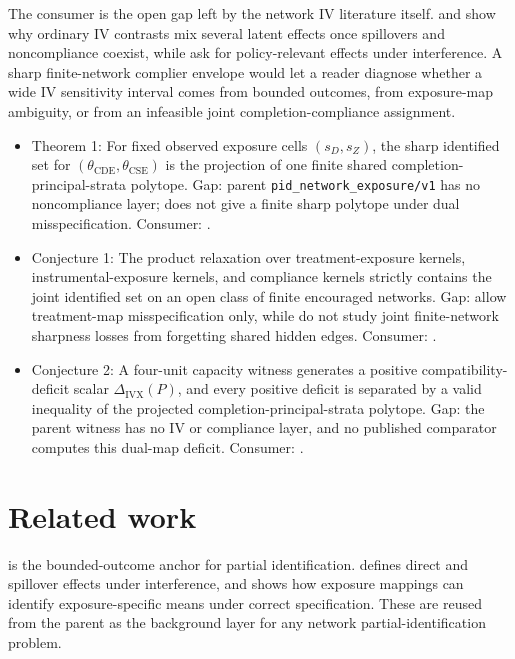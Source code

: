\documentclass[11pt]{article}
\theoremstyle{definition}
\theoremstyle{plain}
\theoremstyle{remark}
\begin{document}
The consumer is the open gap left by the network IV literature itself. \citet{hoshino_yanagi_2024_noncompliance_unknown_interference} and \citet{vazquez_bare_2023_iv_spillovers} show why ordinary IV contrasts mix several latent effects once spillovers and noncompliance coexist, while \citet{nibbering_oosterveen_2025_iv_interference_policy} ask for policy-relevant effects under interference. A sharp finite-network complier envelope would let a reader diagnose whether a wide IV sensitivity interval comes from bounded outcomes, from exposure-map ambiguity, or from an infeasible joint completion-compliance assignment.

\begin{itemize}[leftmargin=*]
\item Theorem 1: For fixed observed exposure cells \((s_D,s_Z)\), the sharp identified set for \((\theta_{\mathrm{CDE}},\theta_{\mathrm{CSE}})\) is the projection of one finite shared completion-principal-strata polytope. Gap: parent \texttt{pid\_network\_exposure/v1} has no noncompliance layer; \citet{hoshino_yanagi_2024_noncompliance_unknown_interference} does not give a finite sharp polytope under dual misspecification. Consumer: \citet{imai_jiang_malani_2021_interference_noncompliance}.
\item Conjecture 1: The product relaxation over treatment-exposure kernels, instrumental-exposure kernels, and compliance kernels strictly contains the joint identified set on an open class of finite encouraged networks. Gap: \citet{schroder_oprescu_feuerriegel_kallus_2026_networks_partialid} allow treatment-map misspecification only, while \citet{hoshino_yanagi_2024_noncompliance_unknown_interference} do not study joint finite-network sharpness losses from forgetting shared hidden edges. Consumer: \citet{savje_2024_misspecified_exposure_mappings}.
\item Conjecture 2: A four-unit capacity witness generates a positive compatibility-deficit scalar \(\Delta_{\mathrm{IVX}}(P)\), and every positive deficit is separated by a valid inequality of the projected completion-principal-strata polytope. Gap: the parent witness has no IV or compliance layer, and no published comparator computes this dual-map deficit. Consumer: \citet{acerenza_martinez_iriarte_sanchez_becerra_spini_2025_household_bounds}.
\end{itemize}

\section{Related work}
\citet{manski1990} is the bounded-outcome anchor for partial identification. \citet{hudgens_halloran_2008} defines direct and spillover effects under interference, and \citet{aronow_samii_2017} shows how exposure mappings can identify exposure-specific means under correct specification. These are reused from the parent as the background layer for any network partial-identification problem.
\end{document}
